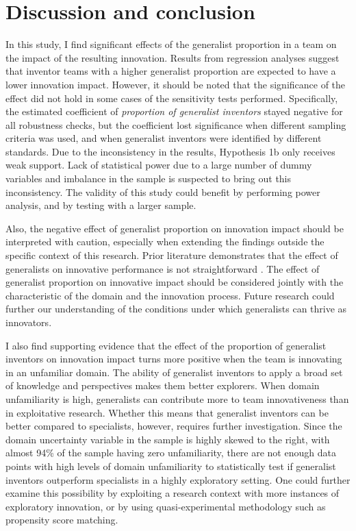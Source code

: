 \documentclass{article}
\begin{document}

\section{Discussion and conclusion}
In this study, I find significant effects of the generalist proportion in a team on the impact of the resulting innovation. Results from regression analyses suggest that inventor teams with a higher generalist proportion are expected to have a lower innovation impact. However, it should be noted that the significance of the effect did not hold in some cases of the sensitivity tests performed. Specifically, the estimated coefficient of \textit{proportion of generalist inventors} stayed negative for all robustness checks, but the coefficient lost significance when different sampling criteria was used, and when generalist inventors were identified by different standards. Due to the inconsistency in the results, Hypothesis 1b only receives weak support. Lack of statistical power due to a large number of dummy variables and imbalance in the sample is suspected to bring out this inconsistency. The validity of this study could benefit by performing power analysis, and by testing with a larger sample.

Also, the negative effect of generalist proportion on innovation impact should be interpreted with caution, especially when extending the findings outside the specific context of this research. Prior literature demonstrates that the effect of generalists on innovative performance is not straightforward \autocite{Vakili2021,Melero2015,Teodoridis2019}. The effect of generalist proportion on innovative impact should be considered jointly with the characteristic of the domain and the innovation process. Future research could further our understanding of the conditions under which generalists can thrive as innovators.

I also find supporting evidence that the effect of the proportion of generalist inventors on innovation impact turns more positive when the team is innovating in an unfamiliar domain. The ability of generalist inventors to apply a broad set of knowledge and perspectives makes them better explorers. When domain unfamiliarity is high, generalists can contribute more to team innovativeness than in exploitative research. Whether this means that generalist inventors can be better compared to specialists, however, requires further investigation. Since the domain uncertainty variable in the sample is highly skewed to the right, with almost 94\% of the sample having zero unfamiliarity, there are not enough data points with high levels of domain unfamiliarity to statistically test if generalist inventors outperform specialists in a highly exploratory setting. One could further examine this possibility by exploiting a research context with more instances of exploratory innovation, or by using quasi-experimental methodology such as propensity score matching.
\end{document}
